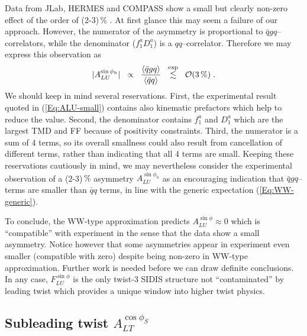 \documentclass[a4paper,11pt]{article}
\newcommand{\blue}[1]{{\color{blue} #1}}
\newcommand{\be}{\begin{equation}}
\newcommand{\ee}{\end{equation}}
\newcommand{\la}{\langle}
\newcommand{\ra}{\rangle}
\newcommand{\ps}[1]{\blue{ #1}}
\begin{document}
Data from JLab, HERMES \ps{and COMPASS} show a small 
but clearly non-zero effect of the order of (2-3)\,$\%$ 
\cite{Avakian:2003pk,Airapetian:2006rx,Gohn:2009zz,Aghasyan:2011ha,
Adolph:2014pwc,Gohn:2014zbz}. At first glance this may seem a failure 
of our approach. However, the numerator of the asymmetry is proportional 
to $\bar q g q$--correlators, while the denominator ($f_1^aD_1^a$) is a 
$q q$--correlator. Therefore we may express this observation as
\be\label{Eq:ALU-small}
    	|A_{LU}^{\sin\phi_h}|
	\;\; \propto \;\;\frac{\la\bar qgq\ra}{\la\bar qq\ra}
    	\;\;\stackrel{\rm exp}{\lesssim} \;\; 
	{\cal O}(3\,\%)
    	\;.
\ee
We should keep in mind several reservations. First,
the experimental result quoted in (\ref{Eq:ALU-small})
contains also kinematic prefactors which help to reduce the value. 
Second, the denominator contains $f_1^a$ and $D_1^a$ which are the
largest TMD and FF because of positivity constraints. Third, the 
numerator is a sum of 4 terms, so its overall smallness could also 
result from cancellation of different terms, rather than indicating
that all 4 terms are small.
Keeping these reservations cautiously in mind, we may nevertheless 
consider the experimental observation of a (2-3)\,$\%$ asymmetry 
$A_{LU}^{\sin\phi_h}$ 
\cite{Avakian:2003pk,Airapetian:2006rx,Gohn:2009zz,Aghasyan:2011ha,
Adolph:2014pwc,Gohn:2014zbz}
as an encouraging indication that $\bar qgq$--terms are smaller than 
$\bar qq$ terms, in line with the generic expectation (\ref{Eq:WW-generic}).

To conclude, the WW-type approximation predicts $A_{LU}^{\sin\phi}\approx 0$
which is ``compatible'' with experiment in the sense that the data show a 
small asymmetry. Notice however that some asymmetries appear in experiment
even smaller (compatible with zero) despite being non-zero in WW-type
approximation. Further work is needed before we can draw definite
conclusions. In any case, $F_{LU}^{\sin\phi}$ is the only twist-3 SIDIS 
structure not ``contaminated'' by leading twist which provides a
unique window into higher twist physics.


\newpage

\subsection{\boldmath Subleading twist  $A_{LT}^{\cos\phi_S}$}
\label{Sec-7.2:FLTcosphiS}
\end{document}
